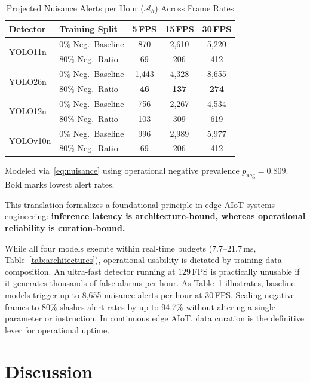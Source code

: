 \documentclass[conference]{IEEEtran}
\begin{document}
\begin{table}[t]
\caption{Projected Nuisance Alerts per Hour ($\mathcal{A}_h$) Across Frame Rates}
\label{tab:deployment}
\centering
\setlength{\tabcolsep}{5pt}
\begin{tabular}{llccc}
\toprule
\textbf{Detector} & \textbf{Training Split} & \textbf{5\,FPS} &
\textbf{15\,FPS} & \textbf{30\,FPS} \\
\midrule
\multirow{2}{*}{YOLO11n}
& 0\% Neg.\ Baseline       & 870   & 2{,}610 & 5{,}220 \\
& 80\% Neg.\ Ratio         & 69    & 206     & 412     \\
\midrule
\multirow{2}{*}{YOLO26n}
& 0\% Neg.\ Baseline       & 1{,}443 & 4{,}328 & 8{,}655 \\
& 80\% Neg.\ Ratio         & \textbf{46} & \textbf{137} & \textbf{274} \\
\midrule
\multirow{2}{*}{YOLO12n}
& 0\% Neg.\ Baseline       & 756   & 2{,}267 & 4{,}534 \\
& 80\% Neg.\ Ratio         & 103   & 309     & 619     \\
\midrule
\multirow{2}{*}{YOLOv10n}
& 0\% Neg.\ Baseline       & 996   & 2{,}989 & 5{,}977 \\
& 80\% Neg.\ Ratio         & 69    & 206     & 412     \\
\bottomrule
\end{tabular}
\vspace{1pt}
{\footnotesize Modeled via~\eqref{eq:nuisance} using operational negative prevalence $p_{\mathrm{neg}}{=}0.809$. Bold marks lowest alert rates.}
\end{table}

This translation formalizes a foundational principle in edge AIoT systems engineering: \textbf{inference latency is architecture-bound, whereas operational reliability is curation-bound.}

While all four models execute within real-time budgets ($7.7$--$21.7$\,ms, Table~\ref{tab:architectures}), operational usability is dictated by training-data composition. An ultra-fast detector running at $129$\,FPS is practically unusable if it generates thousands of false alarms per hour. As Table~\ref{tab:deployment} illustrates, baseline models trigger up to 8{,}655 nuisance alerts per hour at 30\,FPS. Scaling negative frames to 80\% slashes alert rates by up to 94.7\% without altering a single parameter or instruction. In continuous edge AIoT, data curation is the definitive lever for operational uptime.

\section{Discussion}
\label{sec:discussion}
\end{document}
